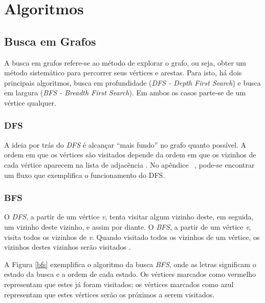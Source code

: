 \section{Algoritmos}

\subsection{Busca em Grafos}

A busca em grafos refere-se ao método de explorar o grafo, ou seja, obter um método sistemático para percorrer seus vértices e arestas. Para isto, há dois principais algoritmos, busca em profundidade (\textit{DFS - Depth First Search}) e busca em largura (\textit{BFS - Breadth First Search}). Em ambos os casos parte-se de um vértice qualquer.

\subsubsection{DFS}
A ideia por trás do \textit{DFS} é alcançar ``mais fundo'' no grafo quanto possível. A ordem em que os vértices são visitados depende da ordem em que os vizinhos de cada vértice aparecem na lista de adjacência \cite{Cormen:2001}. No apêndice ~, pode-se encontrar um fluxo que exemplifica o funcionamento do DFS.

\subsubsection{BFS}

O \textit{DFS}, a partir de um vértice \textit{v}, tenta visitar algum vizinho deste, em seguida, um vizinho deste vizinho, e assim por diante. O \textit{BFS}, a partir de um vértice \textit{v}, visita todos os vizinhos de \textit{v}. Quando visitado todos os vizinhos de um vértice, os vizinhos destes vizinhos serão visitados \cite{Brassard:1988}.

A Figura \ref{bfs} exemplifica o algoritmo da busca \textit{BFS}, onde as letras significam o estado da busca e a ordem de cada estado. Os vértices marcados como vermelho representam que estes já foram visitados; os vértices marcados como azul representam que estes vértices serão os próximos a serem visitados.

